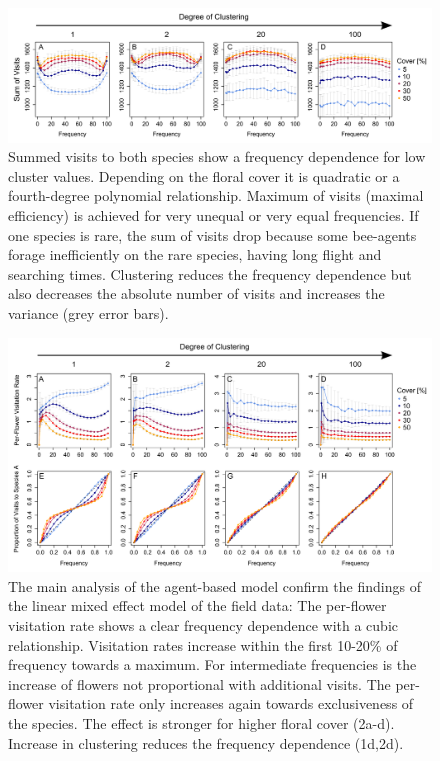 \begin{figure} [!h] %
	\centering
	\includegraphics[width=17cm]{Images/SUM}
	\caption{Summed visits to both species show a frequency dependence for low cluster values. Depending on the floral cover it is quadratic or a fourth-degree polynomial relationship. Maximum of visits (maximal efficiency) is achieved for very unequal or very equal frequencies. If one species is rare, the sum of visits drop because some bee-agents forage inefficiently on the rare species, having long flight and searching times. Clustering reduces the frequency dependence but also decreases the absolute number of visits and increases the variance (grey error bars).}
	\label{fig:SUM}
\end{figure}

\begin{figure} [!ht] %
	\centering
	\includegraphics[width=17cm]{Images/PFV}
	\caption{The main analysis of the agent-based model confirm the findings of the linear mixed effect model of the field data: The per-flower visitation rate shows a clear frequency dependence with a cubic relationship. Visitation rates increase within the first 10-20\% of frequency towards a maximum. For intermediate frequencies is the increase of flowers not proportional with additional visits. The per-flower visitation rate only increases again towards exclusiveness of the species. The effect is stronger for higher floral cover (2a-d). Increase in clustering reduces the frequency dependence (1d,2d).}
	\label{fig:PFV}
\end{figure}

